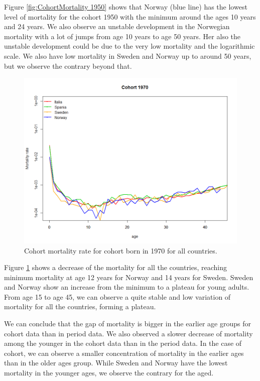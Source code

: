 Figure \ref{fig:CohortMortality 1950} shows that Norway (blue line) has the lowest level of mortality for the cohort 1950 with the minimum around the ages 10 years and 24 years.
We also observe an unstable development in the Norwegian mortality with a lot of jumps from age 10 years to age 50 years.
Her also the unstable development could be due to the very low mortality and the logarithmic scale.
We also have low mortality in Sweden and Norway up to around 50 years, but we observe the contrary beyond that.

            
              
          \begin{figure}[tbh]
             \centering
              \includegraphics[width=0.8\linewidth]{figures/cohortMortalityRate_allCountries1970.png}
              \caption{Cohort mortality rate for cohort born in 1970 for all countries.}
              \label{fig:CohortMortality 1970}
            \end{figure} 
            
          
 Figure \ref{fig:CohortMortality 1970} shows a decrease of the mortality for all the countries, reaching minimum mortality at age 12 years for Norway and 14 years for Sweden.
 Sweden and Norway show an increase from the minimum to a plateau for young adults.
 From age 15 to age 45, we can observe a quite stable and low variation of mortality for all the countries, forming a plateau.
 
We can conclude that the gap of mortality is bigger in the earlier age groups for cohort data than in period data. 
We also observed a slower decrease of mortality among the younger in the cohort data than in the period data.
In the case of cohort, we can observe a smaller concentration of mortality in the earlier ages than in the older ages group. 
While Sweden and Norway have the lowest mortality in the younger ages, we observe the contrary for the aged.

